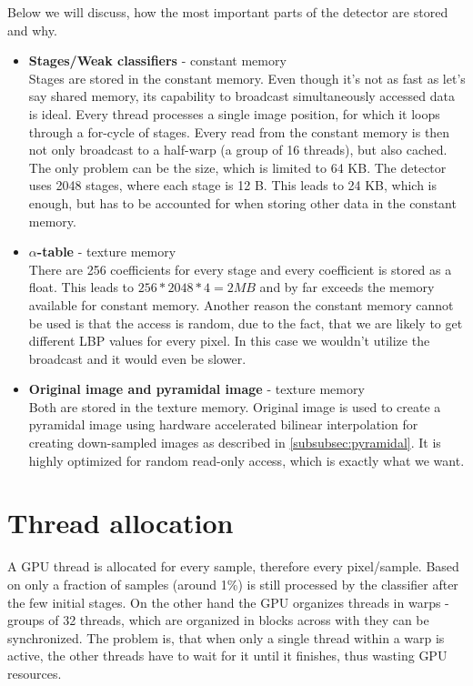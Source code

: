 Below we will discuss, how the most important parts of the detector are stored and why.

\begin{itemize}
\item \textbf{Stages/Weak classifiers} - constant memory \\
Stages are stored in the constant memory. Even though it's not as fast as let's say shared memory, its capability to broadcast simultaneously accessed data is ideal. Every thread processes a single image position, for which it loops through a for-cycle of stages. Every read from the constant memory is then not only broadcast to a half-warp (a group of 16 threads), but also cached. The only problem can be the size, which is limited to 64 KB. The detector uses 2048 stages, where each stage is 12 B. This leads to 24 KB, which is enough, but has to be accounted for when storing other data in the constant memory.

\item \textbf{$\alpha$-table} - texture memory \\
There are 256 coefficients for every stage and every coefficient is stored as a float. This leads to $256 * 2048 * 4 = 2 MB$ and by far exceeds the memory available for constant memory. Another reason the constant memory cannot be used is that the access is random, due to the fact, that we are likely to get different LBP values for every pixel. In this case we wouldn't utilize the broadcast and it would even be slower.

\item \textbf{Original image and pyramidal image} - texture memory \\
Both are stored in the texture memory. Original image is used to create a pyramidal image using hardware accelerated bilinear interpolation for creating down-sampled images as described in \ref{subsubsec:pyramidal}. It is highly optimized for random read-only access, which is exactly what we want.
\end{itemize}

\section{Thread allocation}\label{sec:thread-alloc}

A GPU thread is allocated for every sample, therefore every pixel/sample. Based on \cite{herout-realtime-cuda} only a fraction of samples (around 1\%) is still processed by the classifier after the few initial stages. On the other hand the GPU organizes threads in warps - groups of 32 threads, which are organized in blocks across with they can be synchronized. The problem is, that when only a single thread within a warp is active, the other threads have to wait for it until it finishes, thus wasting GPU resources.

